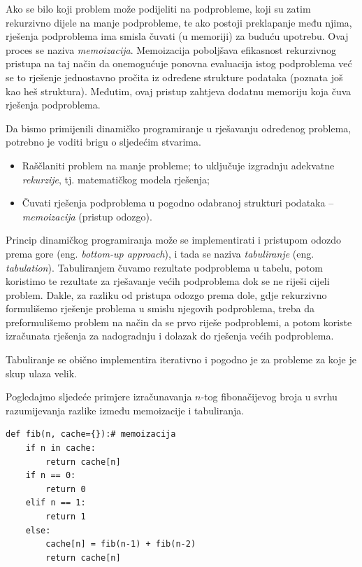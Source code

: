 Ako se bilo koji problem može podijeliti na podprobleme, koji su zatim rekurzivno dijele na manje podprobleme, te ako postoji preklapanje među   njima, rješenja podproblema ima smisla  čuvati (u memoriji) za buduću upotrebu. Ovaj proces se naziva \textit{memoizacija}. Memoizacija poboljšava efikasnost rekurzivnog pristupa na taj način da onemogućuje ponovna  evaluacija  istog podproblema već se to rješenje  jednostavno pročita iz određene strukture podataka (poznata još kao heš struktura).   Međutim, ovaj pristup zahtjeva dodatnu memoriju  koja čuva rješenja podproblema.

Da bismo primijenili dinamičko programiranje u rješavanju određenog problema, potrebno je voditi brigu o sljedećim stvarima.
\begin{itemize}
	\item Raščlaniti problem na manje probleme; to uključuje izgradnju adekvatne \textit{rekurzije}, tj. matematičkog modela rješenja; 
	\item Čuvati rješenja podproblema u pogodno odabranoj strukturi podataka -- \textit{memoizacija} (pristup odozgo).
\end{itemize}
Princip dinamičkog programiranja može se implementirati i pristupom odozdo prema gore (eng. \textit{bottom-up approach}), i tada se naziva \textit{tabuliranje} (eng. \textit{tabulation}). Tabuliranjem čuvamo rezultate podproblema u tabelu, potom koristimo te rezultate za rješavanje većih podproblema dok se ne riješi cijeli problem. Dakle, za razliku od pristupa odozgo prema dole, gdje  rekurzivno formulišemo rješenje problema  u smislu njegovih podproblema,  treba da  preformulišemo problem na način da se prvo riješe podproblemi, a potom koriste izračunata rješenja za nadogradnju i dolazak do rješenja većih podproblema.

Tabuliranje se obično implementira iterativno i pogodno je za probleme za koje je skup ulaza velik.

Pogledajmo sljedeće primjere izračunavanja $n$-tog fibonačijevog broja u svrhu razumijevanja razlike između memoizacije i tabuliranja.   

\begin{verbatim}
def fib(n, cache={}):# memoizacija
	if n in cache:
		return cache[n]
	if n == 0:
		return 0
	elif n == 1:
		return 1
	else:
		cache[n] = fib(n-1) + fib(n-2)
		return cache[n]
\end{verbatim}


